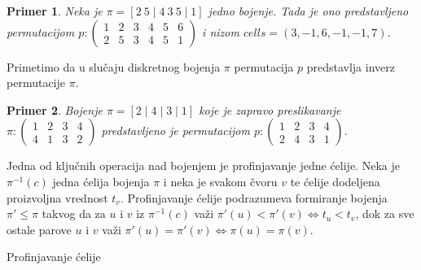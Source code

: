 \documentclass[12pt,oneside]{memoir}
\newtheorem{example}{Primer}
\theoremstyle{definition}
\begin{document}
   \begin{example}
	   Neka je $\pi = [2\ 5 \mid 4\ 3\ 5 \mid 1]$ jedno bojenje. Tada je ono
	   predstavljeno permutacijom
	   $p :
	   \begin{pmatrix}
		   1 & 2 & 3 & 4 & 5 & 6\\
		   2 & 5 & 3 & 4 & 5 & 1
	   \end{pmatrix}$ i nizom $cells = (3, -1, 6, -1, -1, 7)$.
   \end{example}

   Primetimo da u slučaju diskretnog bojenja $\pi$ permutacija $p$ predstavlja
   inverz permutacije $\pi$.

   \begin{example}
	   Bojenje $\pi = [2 \mid 4 \mid 3 \mid 1]$ koje je zapravo preslikavanje
	   $\pi :
	   \begin{pmatrix}
		   1 & 2 & 3 & 4\\
		   4 & 1 & 3 & 2
	   \end{pmatrix}$ predstavljeno je permutacijom
	   $p :
	   \begin{pmatrix}
		   1 & 2 & 3 & 4\\
		   2 & 4 & 3 & 1
	   \end{pmatrix}$.
   \end{example}

   Jedna od ključnih operacija nad bojenjem je profinjavanje jedne ćelije. Neka
   je $\pi^{-1}(c)$ jedna ćelija bojenja $\pi$ i neka je svakom čvoru $v$ te
   ćelije dodeljena proizvoljna vrednost $t_v$. Profinjavanje ćelije
   podrazumeva formiranje bojenja $\pi' \leq \pi$ takvog da za $u$ i $v$ iz
   $\pi^{-1}(c)$ važi $\pi'(u) < \pi'(v) \iff t_u < t_v$, dok za sve ostale
   parove $u$ i $v$ važi $\pi'(u) = \pi'(v) \iff \pi(u) = \pi(v)$.

  \begin{algorithm}[H]
	  \caption{Profinjavanje ćelije}
	  \begin{algorithmic}[]
	      \EndFor
		  \State{}
		  \EndProcedure
	  \end{algorithmic}
  \end{algorithm}
\end{document}
